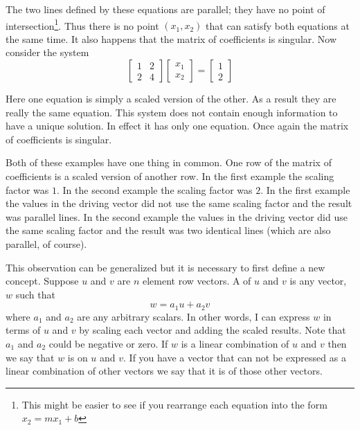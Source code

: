 The two lines defined by these equations are parallel; they have no point of
intersection\footnote{This might be easier to see if you rearrange each equation into the form
  $x_2 = m x_1 + b$}. Thus there is no point $(x_1, x_2)$ that can satisfy both equations at the
same time. It also happens that the matrix of coefficients is singular. Now consider the system
\begin{displaymath}
\left[
\begin{array}{cc}
 1 & 2 \\
 2 & 4
\end{array}
\right]
\left[
\begin{array}{cc}
x_1 \\
x_2
\end{array}
\right] =
\left[
\begin{array}{cc}
1 \\
2
\end{array}
\right]
\end{displaymath}

Here one equation is simply a scaled version of the other. As a result they are really the same
equation. This system does not contain enough information to have a unique solution. In effect
it has only one equation. Once again the matrix of coefficients is singular.

Both of these examples have one thing in common. One row of the matrix of coefficients is a
scaled version of another row. In the first example the scaling factor was $1$. In the second
example the scaling factor was $2$. In the first example the values in the driving vector did
not use the same scaling factor and the result was parallel lines. In the second example the
values in the driving vector did use the same scaling factor and the result was two identical
lines (which are also parallel, of course).


This observation can be generalized but it is necessary to first define a new concept. Suppose
$u$ and $v$ are $n$ element row vectors. A  of $u$ and $v$ is any
vector, $w$ such that
\begin{displaymath}
w = a_1 u + a_2 v
\end{displaymath}
where $a_1$ and $a_2$ are any arbitrary scalars. In other words, I can express $w$ in terms of
$u$ and $v$ by scaling each vector and adding the scaled results. Note that $a_1$ and $a_2$
could be negative or zero. If $w$ is a linear combination of $u$ and $v$ then we say that $w$ is
 on $u$ and $v$. If you have a vector that can not be expressed as a
linear combination of other vectors we say that it is  of those
other vectors.


